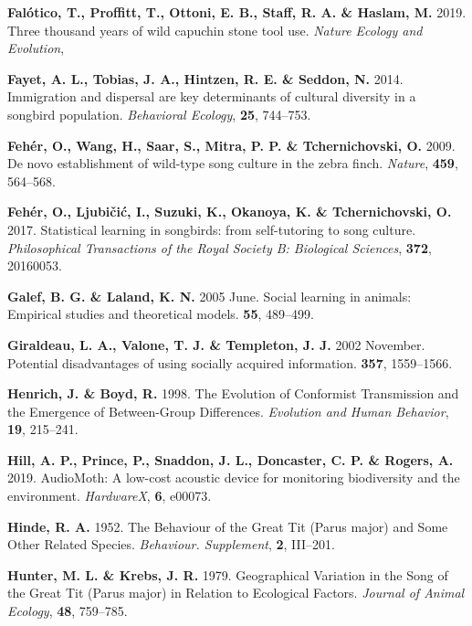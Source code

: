 \documentclass[]{report}
\begin{document}
\leavevmode\hypertarget{ref-Falotico2019}{}%
\textbf{Falótico, T., Proffitt, T., Ottoni, E. B., Staff, R. A. \&
Haslam, M.} 2019. Three thousand years of wild capuchin stone tool use.
\emph{Nature Ecology and Evolution},

\leavevmode\hypertarget{ref-Fayet2014}{}%
\textbf{Fayet, A. L., Tobias, J. A., Hintzen, R. E. \& Seddon, N.} 2014.
Immigration and dispersal are key determinants of cultural diversity in
a songbird population. \emph{Behavioral Ecology}, \textbf{25}, 744--753.

\leavevmode\hypertarget{ref-Feher2009}{}%
\textbf{Fehér, O., Wang, H., Saar, S., Mitra, P. P. \& Tchernichovski,
O.} 2009. De novo establishment of wild-type song culture in the zebra
finch. \emph{Nature}, \textbf{459}, 564--568.

\leavevmode\hypertarget{ref-Feher2017}{}%
\textbf{Fehér, O., Ljubičić, I., Suzuki, K., Okanoya, K. \&
Tchernichovski, O.} 2017. Statistical learning in songbirds: from
self-tutoring to song culture. \emph{Philosophical Transactions of the
Royal Society B: Biological Sciences}, \textbf{372}, 20160053.

\leavevmode\hypertarget{ref-Galef2005}{}%
\textbf{Galef, B. G. \& Laland, K. N.} 2005 June. Social learning in
animals: Empirical studies and theoretical models. \textbf{55},
489--499.

\leavevmode\hypertarget{ref-Giraldeau2002}{}%
\textbf{Giraldeau, L. A., Valone, T. J. \& Templeton, J. J.} 2002
November. Potential disadvantages of using socially acquired
information. \textbf{357}, 1559--1566.

\leavevmode\hypertarget{ref-Henrich1998}{}%
\textbf{Henrich, J. \& Boyd, R.} 1998. The Evolution of Conformist
Transmission and the Emergence of Between-Group Differences.
\emph{Evolution and Human Behavior}, \textbf{19}, 215--241.

\leavevmode\hypertarget{ref-Hill2019b}{}%
\textbf{Hill, A. P., Prince, P., Snaddon, J. L., Doncaster, C. P. \&
Rogers, A.} 2019. AudioMoth: A low-cost acoustic device for monitoring
biodiversity and the environment. \emph{HardwareX}, \textbf{6}, e00073.

\leavevmode\hypertarget{ref-Hinde1952}{}%
\textbf{Hinde, R. A.} 1952. The Behaviour of the Great Tit (Parus major)
and Some Other Related Species. \emph{Behaviour. Supplement},
\textbf{2}, III--201.

\leavevmode\hypertarget{ref-Hunter1979}{}%
\textbf{Hunter, M. L. \& Krebs, J. R.} 1979. Geographical Variation in
the Song of the Great Tit (Parus major) in Relation to Ecological
Factors. \emph{Journal of Animal Ecology}, \textbf{48}, 759--785.
\end{document}
